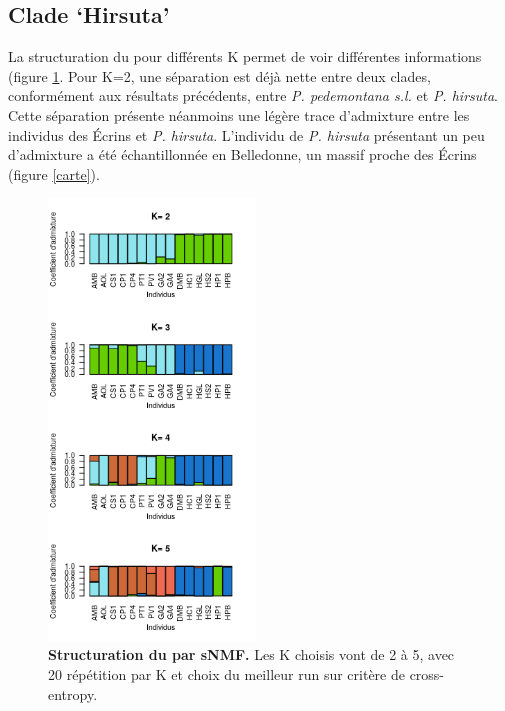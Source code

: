 \subsection{Clade `Hirsuta'}

La structuration du  pour différents K permet de voir différentes informations (figure \ref{structure}. Pour K=2, une séparation est déjà nette entre deux clades, conformément aux résultats précédents, entre \textit{P. pedemontana s.l.} et \textit{P. hirsuta}. Cette séparation présente néanmoins une légère trace d'admixture entre les individus des Écrins et \textit{P. hirsuta}. L'individu de \textit{P. hirsuta} présentant un peu d'admixture a été échantillonnée en Belledonne, un massif proche des Écrins (figure \ref{carte}).

\begin{figure}
	\vspace{-40pt}
	\begin{center}
	\includegraphics[width=0.49\textwidth]{fig/structure_hirsuta.png}
	\end{center}
	\caption{\textbf{Structuration du  par sNMF.} Les K choisis vont de 2 à 5, avec 20 répétition par K et choix du meilleur run sur critère de cross-entropy.}
    \label{structure}
    \vspace{-30pt}
\end{figure}

